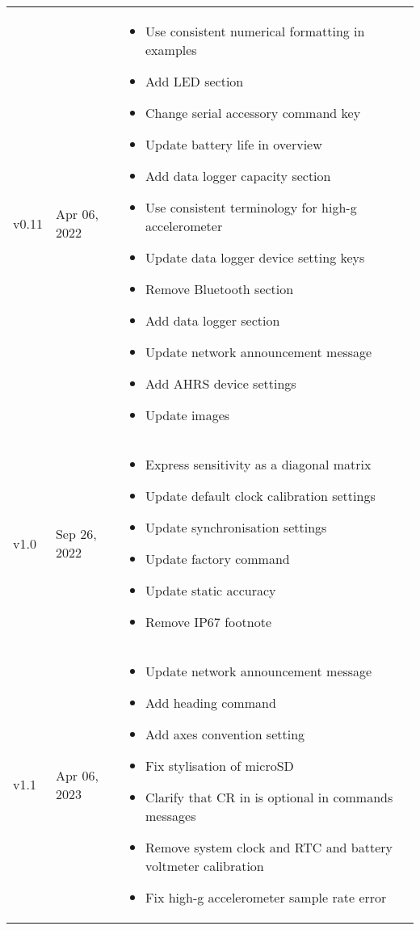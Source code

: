 \begin{longtable}{| >{\centering}p{} | p{} | >{\raggedright\arraybackslash}p{} |}
    v0.11 & Apr 06, 2022 &
    \begin{itemize}
        \item Use consistent numerical formatting in examples
        \item Add \ac{LED} section
        \item Change serial accessory command key
        \item Update battery life in overview
        \item Add data logger capacity section
        \item Use consistent terminology for high-g accelerometer
        \item Update data logger device setting keys
        \item Remove Bluetooth section
        \item Add data logger section
        \item Update network announcement message
        \item Add AHRS device settings
        \item Update images
    \end{itemize}\\
    v1.0 & Sep 26, 2022 &
    \begin{itemize}
        \item Express sensitivity as a diagonal matrix
        \item Update default clock calibration settings
        \item Update synchronisation settings
        \item Update factory command
        \item Update static accuracy
        \item Remove IP67 footnote
    \end{itemize}\\
    v1.1 & Apr 06, 2023 &
    \begin{itemize}
        \item Update network announcement message
        \item Add heading command
        \item Add axes convention setting
        \item Fix stylisation of \ac{microSD}
        \item Clarify that CR in is optional in commands messages
        \item Remove system clock and \ac{RTC} and battery voltmeter calibration
        \item Fix high-g accelerometer sample rate error

\end{itemize}
\end{longtable}
